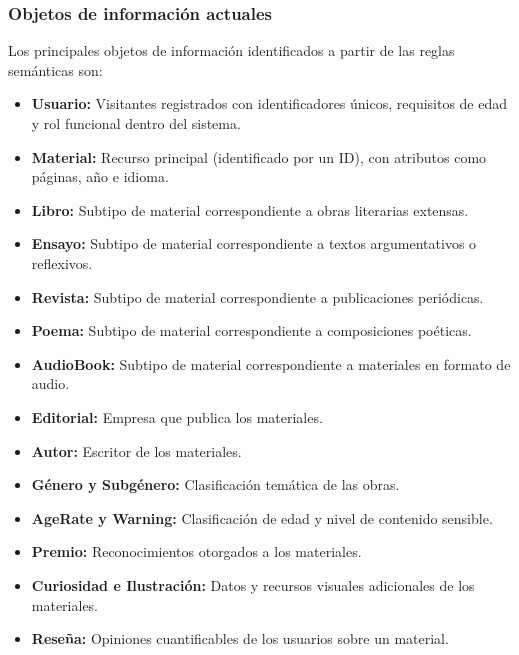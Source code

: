 \documentclass[12pt,a4paper]{article}
\begin{document}
\subsubsection{Objetos de información actuales}
Los principales objetos de información identificados a partir de las reglas semánticas son:
\begin{itemize}
    \item \textbf{Usuario:} Visitantes registrados con identificadores únicos, requisitos de edad y rol funcional dentro del sistema.
    \item \textbf{Material:} Recurso principal (identificado por un ID), con atributos como páginas, año e idioma.
    \item \textbf{Libro:} Subtipo de material correspondiente a obras literarias extensas.
    \item \textbf{Ensayo:} Subtipo de material correspondiente a textos argumentativos o reflexivos.
    \item \textbf{Revista:} Subtipo de material correspondiente a publicaciones periódicas.
    \item \textbf{Poema:} Subtipo de material correspondiente a composiciones poéticas.
    \item \textbf{AudioBook:} Subtipo de material correspondiente a materiales en formato de audio.
    \item \textbf{Editorial:} Empresa que publica los materiales.
    \item \textbf{Autor:} Escritor de los materiales.
    \item \textbf{Género y Subgénero:} Clasificación temática de las obras.
    \item \textbf{AgeRate y Warning:} Clasificación de edad y nivel de contenido sensible.
    \item \textbf{Premio:} Reconocimientos otorgados a los materiales.
    \item \textbf{Curiosidad e Ilustración:} Datos y recursos visuales adicionales de los materiales.
    \item \textbf{Reseña:} Opiniones cuantificables de los usuarios sobre un material.
\end{itemize}
\end{document}
